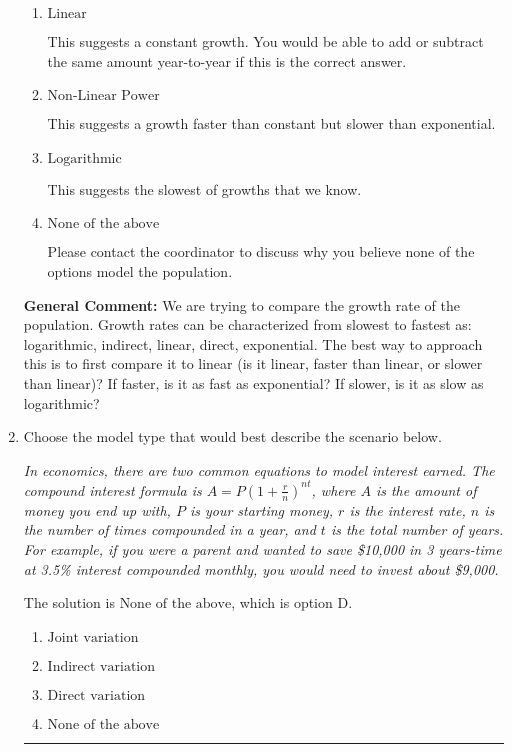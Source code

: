 \documentclass{extbook}[14pt]
\newcommand{\litem}[1]{\item #1

\rule{\textwidth}{0.4pt}}
\begin{document}
\begin{enumerate}
{\begin{enumerate}[label=\Alph*.]
This suggests the fastest of growths that we know.
\item \( \text{Linear} \)

This suggests a constant growth. You would be able to add or subtract the same amount year-to-year if this is the correct answer.
\item \( \text{Non-Linear Power} \)

This suggests a growth faster than constant but slower than exponential.
\item \( \text{Logarithmic} \)

This suggests the slowest of growths that we know.
\item \( \text{None of the above} \)

Please contact the coordinator to discuss why you believe none of the options model the population.
\end{enumerate}

\textbf{General Comment:} We are trying to compare the growth rate of the population. Growth rates can be characterized from slowest to fastest as: logarithmic, indirect, linear, direct, exponential. The best way to approach this is to first compare it to linear (is it linear, faster than linear, or slower than linear)? If faster, is it as fast as exponential? If slower, is it as slow as logarithmic?
}
\litem{
Choose the model type that would best describe the scenario below.

\begin{center}
    \textit{ In economics, there are two common equations to model interest earned. The compound interest formula is $A = P (1 + \frac{r}{n})^{nt}$, where $A$ is the amount of money you end up with, $P$ is your starting money, $r$ is the interest rate, $n$ is the number of times compounded in a year, and $t$ is the total number of years. For example, if you were a parent and wanted to save \$10,000 in 3 years-time at 3.5\% interest compounded monthly, you would need to invest about \$9,000. }
\end{center}
The solution is \( \text{None of the above} \), which is option D.\begin{enumerate}[label=\Alph*.]
\item \( \text{Joint variation} \)


\item \( \text{Indirect variation} \)


\item \( \text{Direct variation} \)


\item \( \text{None of the above} \)



\end{enumerate}}
\end{enumerate}
\end{document}
